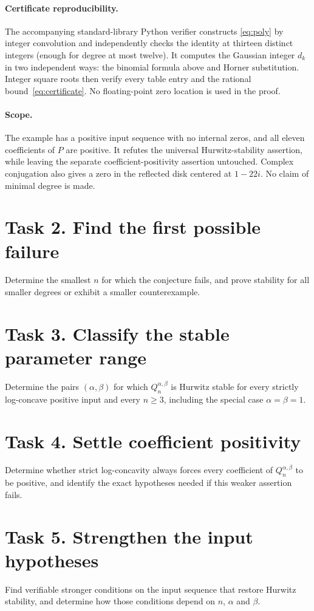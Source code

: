 \documentclass[11pt]{article}
\begin{document}
\paragraph{Certificate reproducibility.}
The accompanying standard-library Python verifier constructs
\eqref{eq:poly} by integer convolution and independently checks the
identity at thirteen distinct integers (enough for degree at most twelve).
It computes the Gaussian integer $d_k$ in two independent ways: the
binomial formula above and Horner substitution. Integer square roots
then verify every table entry and the rational bound~\eqref{eq:certificate}.
No floating-point zero location is used in the proof.

\paragraph{Scope.}
The example has a positive input sequence with no internal zeros, and
all eleven coefficients of $P$ are positive. It refutes the universal
Hurwitz-stability assertion, while leaving the separate coefficient-positivity
assertion untouched. Complex conjugation also gives a zero in the reflected
disk centered at $1-22i$. No claim of minimal degree is made.

\section*{Task 2. Find the first possible failure}
Determine the smallest $n$ for which the conjecture fails, and prove
stability for all smaller degrees or exhibit a smaller counterexample.

\section*{Task 3. Classify the stable parameter range}
Determine the pairs $(\alpha,\beta)$ for which $Q_n^{\alpha,\beta}$
is Hurwitz stable for every strictly log-concave positive input and every
$n\geq3$, including the special case $\alpha=\beta=1$.

\section*{Task 4. Settle coefficient positivity}
Determine whether strict log-concavity always forces every coefficient
of $Q_n^{\alpha,\beta}$ to be positive, and identify the exact hypotheses
needed if this weaker assertion fails.

\section*{Task 5. Strengthen the input hypotheses}
Find verifiable stronger conditions on the input sequence that restore
Hurwitz stability, and determine how those conditions depend on
$n$, $\alpha$ and $\beta$.
\end{document}
